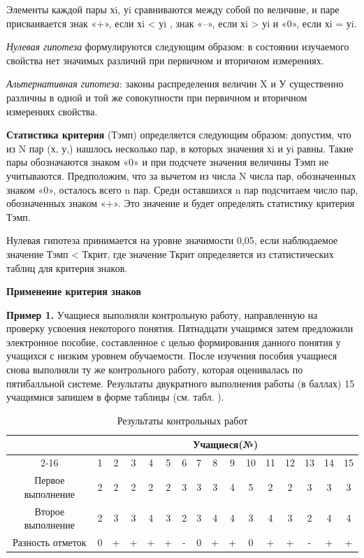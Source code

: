 \documentclass[12pt]{article}
\begin{document}
Элементы каждой пары хi, уi сравниваются между собой по величине, и паре присваивается знак «+», если хi < уi , знак «–», если хi > уi  и «0», если хi = уi.

\textit{Нулевая гипотеза} формулируются следующим образом: в состоянии изучаемого свойства нет значимых различий при первичном и вторичном измерениях.

\textit{Альтернативная гипотеза}: законы распределения величин X и У существенно различны в одной и той же совокупности при первичном и вторичном измерениях свойства.

\bigskip
\textbf{Статистика критерия} (Тэмп) определяется следующим образом:
допустим, что из N пар (х, у,) нашлось несколько пар, в которых значения хi  и уi равны. Такие пары обозначаются знаком «0» и при подсчете значения величины Тэмп не учитываются. Предположим, что за вычетом из числа N числа пар, обозначенных знаком «0», осталось всего n пар. Среди оставшихся n пар подсчитаем число пар, обозначенных знаком «+». Это значение и будет определять статистику критерия Тэмп.

Нулевая гипотеза принимается на уровне значимости 0,05, если наблюдаемое значение Тэмп < Ткрит, где значение Ткрит определяется из статистических таблиц для критерия знаков.

\medskip
\textbf{Применение критерия знаков}

\medskip
\textbf{Пример 1.} Учащиеся выполняли контрольную работу, направленную на проверку усвоения некоторого понятия. Пятнадцати учащимся затем предложили электронное пособие, составленное с целью формирования данного понятия у учащихся с низким уровнем обучаемости. После изучения пособия учащиеся снова выполняли ту же контрольного работу, которая оценивалась по пятибалльной системе.
Результаты двукратного выполнения работы (в баллах) 15 учащимися запишем в форме таблицы (см. табл. ).

\begin{table}[h]
    \centering
    \caption{Результаты контрольных работ}
    \bigskip
    \begin{tabular}{|c|c|c|c|c|c|c|c|c|c|c|c|c|c|c|c|} \hline
         \multirow{2}{*}{}&\multicolumn{15}{c|}{\textbf{Учащиеся(№)}} \\ \cline{2-16}
        &1&2&3&4&5&6&7&8&9&10&11&12&13&14&15 \\ \hline
        Первое выполнение&2&2&2&2&2&3&3&3&4&5&2&2&3&3&3 \\ \hline
        Второе выполнение&2&3&3&4&3&2&3&4&4&3&4&3&2&4&4 \\ \hline
        Разность отметок&0&+&+&+&+&-&0&+&+&0&+&+&-&+&+ \\ \hline
    \end{tabular}
\end{table}
\end{document}
